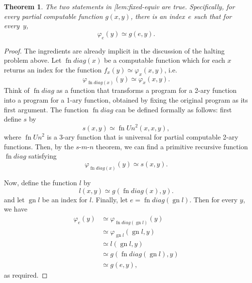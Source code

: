 \documentclass[10pt,a4paper]{article}
\makeatletter
\theoremstyle{plain}
\newtheorem{thm}{Theorem}[section]
\theoremstyle{definition}
\theoremstyle{remark}
\newcommand{\olref}{\@ifnextchar[{\olref@i}{\olref@final}}
\def\olref@i[#1]{\@ifnextchar[{\olref@ii}{\olref@final}}
\def\olref@ii[#1]{\@ifnextchar[{\olref@iii}{\olref@final}}
\def\olref@iii[#1]{\olref@final}
\def\olref@final#1{\ref{#1}}
\providecommand{\cfind}[1]{\varphi_{#1}}
\providecommand{\gn}{\operatorname{gn}}
\providecommand{\fn}{\operatorname{fn}}
\makeatother
\begin{document}
\begin{thm}
The two statements in \olref{lem:fixed-equiv} are
true. Specifically, for every partial computable function $g(x,y)$,
there is an index~$e$ such that for every~$y$,
\[
\cfind{e}(y) \simeq g(e,y).
\]
\end{thm}

\begin{proof}
The ingredients are already implicit in the discussion of the halting
problem above. Let $\fn{diag}(x)$ be a computable function which for each
$x$ returns an index for the function $f_x(y) \simeq \cfind{x}(x,y)$,
i.e.
\[
\cfind{\fn{diag}(x)}(y) \simeq \cfind{x}(x,y).
\]
Think of $\fn{diag}$ as a function that transforms a program for a 2-ary
function into a program for a 1-ary function, obtained by fixing the
original program as its first argument. The function $\fn{diag}$ can be
defined formally as follows: first define $s$ by
\[
s(x,y) \simeq \fn{Un}^2(x,x,y),
\]
where $\fn{Un}^2$ is a 3-ary function that is universal for partial computable
2-ary functions. Then, by the $s$-$m$-$n$ theorem, we can find a primitive
recursive function $\fn{diag}$ satisfying
\[
\cfind{\fn{diag}(x)}(y) \simeq s(x,y).
\]

Now, define the function $l$ by
\[
l(x,y) \simeq g(\fn{diag}(x),y).
\]
and let $\gn{l}$ be an index for $l$. Finally, let $e = \fn{diag}(\gn{l})$.
Then for every $y$, we have
\begin{align*}
\cfind{e}(y) & \simeq \cfind{\fn{diag}(\gn{l})}(y) \\
& \simeq \cfind{\gn{l}}(\gn{l}, y) \\
& \simeq l(\gn{l}, y) \\
& \simeq g(\fn{diag}(\gn{l}),y) \\
& \simeq g(e, y),
\end{align*}
as required.
\end{proof}
\end{document}

